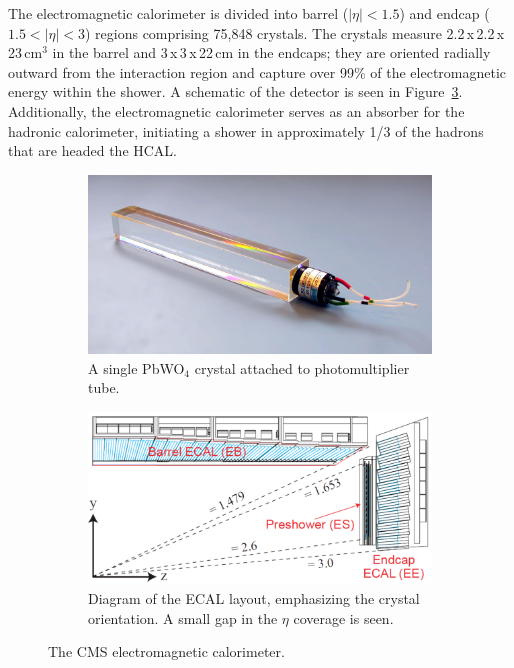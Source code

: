 The electromagnetic calorimeter is divided into barrel ($|\eta|<1.5$) and endcap ($1.5<|\eta|<3$) regions comprising 75,848 crystals. The crystals measure 2.2$\,$x$\,$2.2$\,$x$\,$23$\,$cm$^{3}$ in the barrel and 3$\,$x$\,$3$\,$x$\,$22$\,$cm in the endcaps; they are oriented radially outward from the interaction region and capture over 99\% of the electromagnetic energy within the shower. A schematic of the detector is seen in Figure~\ref{fig:ecal}. Additionally, the electromagnetic calorimeter serves as an absorber for the hadronic calorimeter, initiating a shower in approximately 1/3 of the hadrons that are headed the HCAL.

\begin{figure}
\centering
\begin{subfigure}[c]{0.35\textwidth}
\includegraphics[width=\textwidth]{figs/ecalcrystal.jpg}
\caption{A single PbWO$_{4}$ crystal attached to photomultiplier tube.}
\label{fig:ecalcrystal}
\end{subfigure}
\begin{subfigure}[c]{0.625\textwidth}
\includegraphics[width=\textwidth]{figs/ecal.png}
\caption{Diagram of the ECAL layout, emphasizing the crystal orientation. A small gap in the $\eta$ coverage is seen.}
\label{fig:ecal}
\end{subfigure}
\caption{The CMS electromagnetic calorimeter.}
\end{figure}


